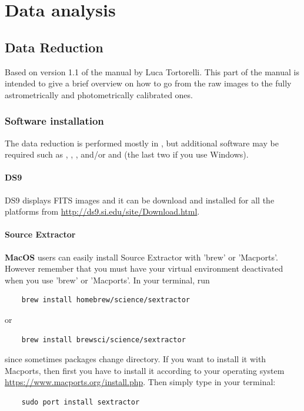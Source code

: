\documentclass[a4paper, 11pt, fleqn]{memoir}
\begin{document}
\part{Data analysis}

\chapter{Data Reduction}

Based on version 1.1 of the manual by Luca Tortorelli\autocite{Tortorelli2015_DataReduction}.
This part of the manual is intended to give a brief overview on how to go from the raw images to the fully astrometrically and photometrically calibrated ones.

\section{Software installation}

The data reduction is performed mostly in , but additional software may be required such as , , ,  and/or  and  (the last two if you use Windows).


\subsection{DS9}

DS9 displays FITS images and it can be download and installed for all the platforms from \url{http://ds9.si.edu/site/Download.html}.

\subsection{Source Extractor}

\textbf{MacOS} users can easily install Source Extractor with 'brew' or 'Macports'.
However remember that you must have your virtual environment deactivated when you use 'brew' or 'Macports'.
In your terminal, run
\begin{verbatim}
    brew install homebrew/science/sextractor
\end{verbatim}
or
\begin{verbatim}
    brew install brewsci/science/sextractor
\end{verbatim}
since sometimes packages change directory.
If you want to install it with Macports, then first you have to install it according to your operating system \url{https://www.macports.org/install.php}.
Then simply type in your terminal:
\begin{verbatim}
    sudo port install sextractor
\end{verbatim}
\end{document}
